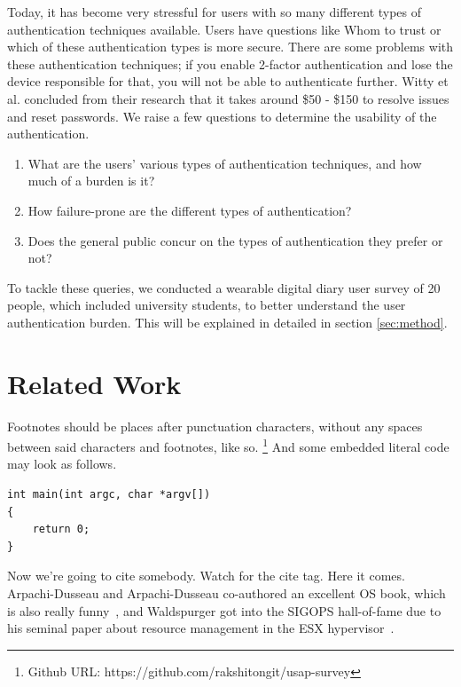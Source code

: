 Today, it has become very stressful for users with so many different types of authentication techniques available.  Users have questions like Whom to trust or which of these authentication types is more secure. There are some problems with these authentication techniques; if you enable 2-factor authentication and lose the device responsible for that, you will not be able to authenticate further. Witty et al. \cite{} concluded from their research that it takes around \$50 - \$150 to resolve issues and reset passwords. We raise a few questions to determine the usability of the authentication. 
\begin{enumerate}
    \item What are the users' various types of authentication techniques, and how much of a burden is it?
    \item How failure-prone are the different types of authentication? 
    \item Does the general public concur on the types of authentication they prefer or not?
\end{enumerate}

To tackle these queries, we conducted a wearable digital diary user survey of 20 people, which included university students, to better understand the user authentication burden. This will be explained in detailed in section \ref{sec:method}.


\section{Related Work}

Footnotes should be places after punctuation characters, without any
spaces between said characters and footnotes, like so.%
\footnote{Github URL: https://github.com/rakshitongit/usap-survey} And some embedded literal code may
look as follows.

\begin{verbatim}
int main(int argc, char *argv[]) 
{
    return 0;
}
\end{verbatim}

Now we're going to cite somebody. Watch for the cite tag. Here it
comes. Arpachi-Dusseau and Arpachi-Dusseau co-authored an excellent OS
book, which is also really funny~\cite{arpachiDusseau18:osbook}, and
Waldspurger got into the SIGOPS hall-of-fame due to his seminal paper
about resource management in the ESX hypervisor~\cite{waldspurger02}.

